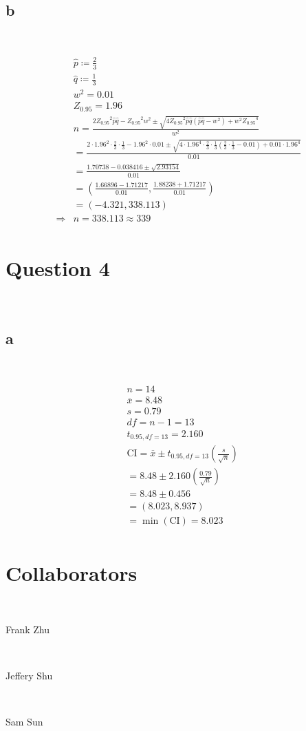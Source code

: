 \documentclass{article}
\begin{document}
~

\subsection*{b}

~

\begin{align*}
    &\hat{p}\coloneqq \frac{2}{3}\\
    &\hat{q}\coloneqq \frac{1}{3}\\
    &\mathit{w}^2=0.01\\
    &Z_{0.95}=1.96\\
    &n=\frac{2{Z_{0.95}}^2\hat{p}\hat{q}-{Z_{0.95}}^2\mathit{w}^2\pm\sqrt{4{Z_{0.95}}^2\hat{p}\hat{q}(\hat{p}\hat{q}-\mathit{w}^2)+\mathit{w}^2{Z_{0.95}}^4}}{\mathit{w}^2}\\
    &=\frac{2\cdot1.96^2\cdot\frac{2}{3}\cdot\frac{1}{3}-1.96^2\cdot0.01\pm\sqrt{4\cdot1.96^4\cdot\frac{2}{3}\cdot\frac{1}{3}(\frac{2}{3}\cdot\frac{1}{3}-0.01)+0.01\cdot1.96^4}}{0.01}\\
    &=\frac{1.70738-0.038416\pm\sqrt{2.93154}}{0.01}\\
    &=(\frac{1.66896-1.71217}{0.01},\frac{1.88238+1.71217}{0.01})\\
    &=(-4.321,338.113)\\
    \Rightarrow&n=338.113\approx339\\
\end{align*}

\newpage

\section*{Question 4}

~

\subsection*{a}

~

\begin{align*}
    &n=14\\
    &\overline{x}=8.48\\
    &s=0.79\\
    &df=n-1=13\\
    &t_{0.95,df=13}=2.160\\
    &\text{CI}=\overline{x}\pm t_{0.95,df=13}(\frac{s}{\sqrt{n}})\\
    &=8.48\pm 2.160(\frac{0.79}{\sqrt{n}})\\
    &=8.48\pm0.456\\
    &=(8.023,8.937)\\
    &=\min(\text{CI})=8.023\\
\end{align*}

\newpage

\section*{Collaborators}

~

Frank Zhu

~

Jeffery Shu

~

Sam Sun
\end{document}
